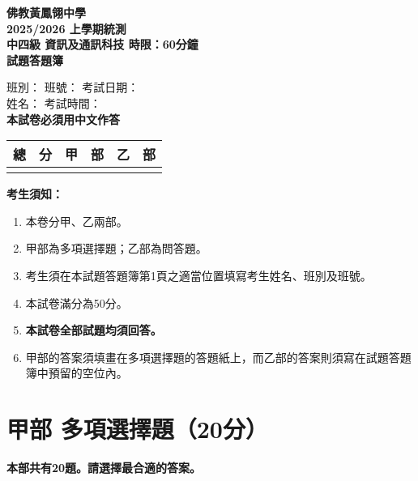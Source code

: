 \documentclass[12pt,a4paper]{article}
\newcommand{\answerline}[1]{\underline{\hspace{#1}}}
\begin{document}
\begin{center}
{\Large\bfseries 佛教黃鳳翎中學}\\[0.5em]
{\Large\bfseries 2025/2026 上學期統測}\\[1em]
{\Large\bfseries 中四級 \quad 資訊及通訊科技 \quad 時限：60分鐘}\\[1.5em]
{\Large\bfseries 試題答題簿}
\end{center}

\vspace{1.5em}

班別：\answerline{3cm} \quad 班號：\answerline{2cm} \quad 考試日期：\answerline{3cm}\\[0.8em]
姓名：\answerline{8cm} \quad 考試時間：\answerline{3cm}\\[0.8em]

\textbf{本試卷必須用中文作答}

\vspace{1em}

\begin{center}
\begin{tabular}{|c|c|c|}
\hline
總　分 & 甲　部 & 乙　部 \\
\hline
& & \\
\hline
\end{tabular}
\end{center}

\vspace{1em}

\textbf{考生須知：}
\begin{enumerate}
\item 本卷分甲、乙兩部。
\item 甲部為多項選擇題；乙部為問答題。
\item 考生須在本試題答題簿第1頁之適當位置填寫考生姓名、班別及班號。
\item 本試卷滿分為50分。
\item \textbf{本試卷全部試題均須回答。}
\item 甲部的答案須填畫在多項選擇題的答題紙上，而乙部的答案則須寫在試題答題簿中預留的空位內。
\end{enumerate}

\newpage

\section{\textbf{甲部 多項選擇題（20分）}}

\textbf{本部共有20題。請選擇最合適的答案。}
\end{document}
